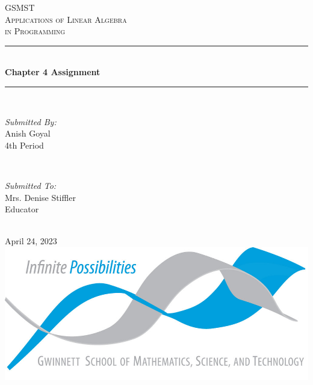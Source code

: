 \begin{titlepage}

    \newcommand{\HRule}{\rule{\linewidth}{0.5mm}}
    
    \center
    
    \textsc{\LARGE GSMST }\\[0.3cm]
    \textsc{\Large Applications of Linear Algebra }\\[0.3cm]
    \textsc{\Large in Programming}\\[0.5cm]
    
    \HRule \\[0.4cm]
    { \huge \bfseries Chapter 4 Assignment}\\[0.03cm]
    \HRule \\[1.5cm]
    
    \begin{minipage}{0.4\textwidth}
    \begin{flushleft} \large
    \emph{Submitted By:}\\
    Anish Goyal \\4th Period
    \end{flushleft}
    \end{minipage}
    ~
    \begin{minipage}{0.4\textwidth}
    \begin{flushright} \large
    \emph{Submitted To:} \\
    Mrs. Denise Stiffler\\Educator
    \end{flushright}
    \end{minipage}\\[1cm]
    
    {\large April 24, 2023}\\[1cm]
    
    \includegraphics{logo.png}\\[1cm]
    \vfill
    \end{titlepage}